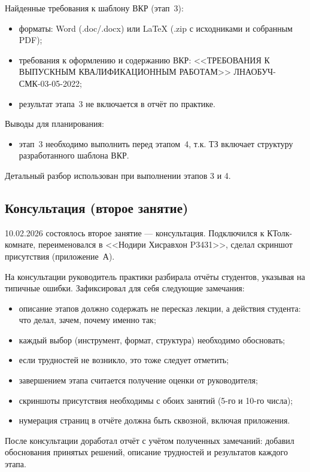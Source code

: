 \documentclass[a4paper,14pt]{extarticle}
\begin{document}
Найденные требования к шаблону ВКР (этап~3):
\begin{itemize}
  \item форматы: Word (.doc/.docx) или \LaTeX{} (.zip с исходниками и собранным PDF);
  \item требования к оформлению и содержанию ВКР: <<ТРЕБОВАНИЯ К ВЫПУСКНЫМ КВАЛИФИКАЦИОННЫМ РАБОТАМ>> ЛНАОБУЧ-СМК-03-05-2022;
  \item результат этапа~3 не включается в отчёт по практике.
\end{itemize}

Выводы для планирования:
\begin{itemize}
  \item этап~3 необходимо выполнить перед этапом~4, т.к. ТЗ включает структуру разработанного шаблона ВКР.
\end{itemize}

Детальный разбор использован при выполнении этапов 3 и 4.

\subsection{Консультация (второе занятие)}

10.02.2026 состоялось второе занятие --- консультация. Подключился к КТолк-комнате, переименовался в <<Нодири Хисравхон P3431>>, сделал скриншот присутствия (приложение~А).

На консультации руководитель практики разбирала отчёты студентов, указывая на типичные ошибки. Зафиксировал для себя следующие замечания:
\begin{itemize}
  \item описание этапов должно содержать не пересказ лекции, а действия студента: что делал, зачем, почему именно так;
  \item каждый выбор (инструмент, формат, структура) необходимо обосновать;
  \item если трудностей не возникло, это тоже следует отметить;
  \item завершением этапа считается получение оценки от руководителя;
  \item скриншоты присутствия необходимы с обоих занятий (5-го и 10-го числа);
  \item нумерация страниц в отчёте должна быть сквозной, включая приложения.
\end{itemize}

После консультации доработал отчёт с учётом полученных замечаний: добавил обоснования принятых решений, описание трудностей и результатов каждого этапа.
\end{document}
